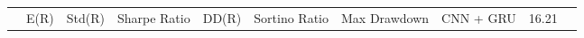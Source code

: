 \begin{tabular}{lrrrrrrrrr}
 & E(R) & Std(R) & Sharpe Ratio & DD(R) & Sortino Ratio & Max Drawdown & %
CNN + GRU & 16.21%
\end{tabular}

